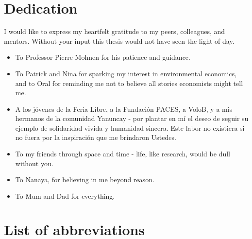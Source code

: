 \documentclass[a4paper,12pt]{article}
\theoremstyle{plain}
\theoremstyle{definition}
\theoremstyle{definition}
\theoremstyle{definition}
\theoremstyle{definition}
\begin{document}
\section*{Dedication}
\vspace{1cm}
I would like to express my heartfelt gratitude to my peers, colleagues, and mentors. Without your input this thesis would not have seen the light of day.
\begin{itemize}
    \item [] To Professor Pierre Mohnen for his patience and guidance.
    \item [] To Patrick and Nina for sparking my interest in environmental economics, and to Oral for reminding me not to believe all stories economists might tell me.
    \item [] A los jóvenes de la Feria Líbre, a la Fundación PACES, a VoloB, y a mis hermanos de la comunidad Yanuncay - por plantar en mí el deseo de seguir su ejemplo de solidaridad vivida y humanidad sincera. Este labor no existiera si no fuera por la inspiración que me brindaron Ustedes.
    \item [] To my friends through space and time - life, like research, would be dull without you.
    \item [] To Nanaya, for believing in me beyond reason.
    \item [] To Mum and Dad for everything.
\end{itemize}

    \clearpage

\section*{List of abbreviations}
\end{document}
